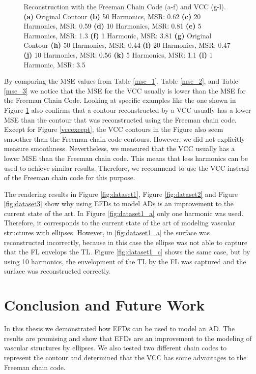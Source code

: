 \documentclass[thesis.tex]{subfiles}
\begin{document}
\begin{figure}[!htb]
\caption{Reconstruction with the Freeman Chain Code (a-f) and VCC (g-l). \textbf{(a)} Original Contour \textbf{(b)} 50 Harmonics, MSR: 0.62 \textbf{(c)} 20 Harmonics, MSR: 0.59 \textbf{(d)} 10 Harmonics, MSR: 0.81 \textbf{(e)} 5 Harmonics, MSR: 1.3 \textbf{(f)} 1 Harmonic, MSR: 3.81 \textbf{(g)} Original Contour \textbf{(h)} 50 Harmonics, MSR: 0.44 \textbf{(i)} 20 Harmonics, MSR: 0.47 \textbf{(j)} 10 Harmonics, MSR: 0.56 \textbf{(k)} 5 Harmonics, MSR: 1.1 \textbf{(l)} 1 Harmonic, MSR: 3.5}
\label{fig:slice_fcc}
\end{figure}

By comparing the MSE values from Table \ref{mse_1}, Table \ref{mse_2}, and Table \ref{mse_3} we notice that the MSE for the VCC usually is lower than the MSE for the Freeman Chain Code. Looking at specific examples like the one shown in Figure \ref{fig:slice_fcc} also confirms that a contour reconstructed by a VCC usually has a lower MSE than the contour that was reconstructed using the Freeman chain code. Except for Figure \ref{vccexcept}, the VCC contours in the Figure also seem smoother than the Freeman chain code contours. However, we did not explicitly measure smoothness. Nevertheless, we measured that the VCC usually has a lower MSE than the Freeman chain code. This means that less harmonics can be used to achieve similar results. Therefore, we recommend to use the VCC instead of the Freeman chain code for this purpose.  

The rendering results in Figure \ref{fig:dataset1}, Figure \ref{fig:dataset2} and Figure \ref{fig:dataset3} show why using EFDs to model ADs is an improvement to the current state of the art. In Figure \ref{fig:dataset1_a} only one harmonic was used. Therefore, it corresponds to the current state of the art of modeling vascular structures with ellipses. However, in \ref{fig:dataset1_a} the surface was reconstructed incorrectly, because in this case the ellipse was not able to capture that the FL envelops the TL. Figure \ref{fig:dataset1_c} shows the same case, but by using 10 harmonics, the envelopment of the TL by the FL was captured and the surface was reconstructed correctly. 

\chapter{Conclusion and Future Work}\label{chap:basics}

In this thesis we demonstrated how EFDs can be used to model an AD. The results are promising and show that EFDs are an improvement to the modeling of vascular structures by ellipses. We also tested two different chain codes to represent the contour and determined that the VCC has some advantages to the Freeman chain code. 
\end{document}
